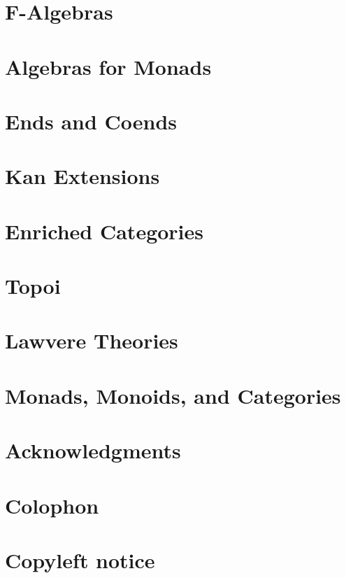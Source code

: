 \chapter{F-Algebras}\label{f-algebras}


\chapter{Algebras for Monads}\label{algebras-for-monads}


\chapter{Ends and Coends}\label{ends-and-coends}


\chapter{Kan Extensions}\label{kan-extensions}


\chapter{Enriched Categories}\label{enriched-categories}


\chapter{Topoi}\label{topoi}


\chapter{Lawvere Theories}\label{lawvere-theories}


\chapter{Monads, Monoids, and Categories}\label{monads-monoids-categories}


\backmatter

\appendix
{}


\makeatletter\@openrightfalse
\chapter*{Acknowledgments}\label{acknowledgments}


\chapter*{Colophon}\label{colophon}


\chapter*{Copyleft notice}\label{copyleft}

\@openrighttrue\makeatother
\afterpage{\blankpage}
